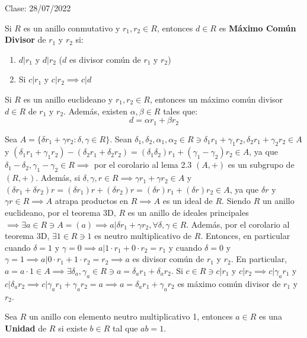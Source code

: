 Clase: 28/07/2022

\begin{definicion}
    Si $R$ es un anillo conmutativo y $r_1,r_2\in R$, entonces $d\in R$ es \textbf{Máximo Común Divisor} de $r_1$ y $r_2$ si: 
    \begin{enumerate}
        \item $d|r_1$ y $d|r_2$ ($d$ es divisor común de $r_1$ y $r_2$)
        \item Si $c|r_1$ y $c|r_2\implies c|d$
    \end{enumerate}
\end{definicion}

\begin{lema}[3.8]
    Si $R$ es un anillo euclideano y $r_1,r_2\in R$, entonces un máximo común divisor $d\in R$ de $r_1$ y $r_2$. Además, existen $\alpha,\beta \in R$ tales que: 
    $$d=\alpha r_1+\beta r_2$$
    \begin{dem}
        Sea $A=\{\delta r_1+ \gamma r_2:\delta, \gamma\in R \}$. Sean $\delta_1,\delta_2,\alpha_1,\alpha_2\in R\ni \delta_1r_1+\gamma_1r_2, \delta_2 r_1+\gamma_2r_2\in A$ y $(\delta_1r_1+\gamma_1r_2)-(\delta_2r_1+\delta_2r_2)=(\delta_1\delta_2)r_1 + (\gamma_1-\gamma_2)r_2\in A$, ya que $\delta_1-\delta_2,\gamma_1-\gamma_2\in R\implies$ por el corolario al lema 2.3 $(A,+)$ es un subgrupo de $(R,+)$. Además, si $\delta, \gamma,r\in R\implies \gamma r_1+\gamma r_2\in A$ y $(\delta r_1+\delta r_2)r=(\delta r_1)r+(\delta r_2)r=(\delta r)r_1+(\delta r)r_2\in A$, ya que $\delta r$ y $\gamma r\in R\implies A$ atrapa productos en $R\implies A$ es un ideal de $R$. Siendo $R$ un anillo euclideano, por el teorema 3D, $R$ es un anillo de ideales principales $\implies \exists a\in R\ni A=(a)\implies a|\delta r_1+\gamma r_2,\forall \delta, \gamma \in R$. Además, por el corolario al teorema 3D, $\exists 1\in R\ni 1$ es neutro multiplicativo de $R$. Entonces, en particular cuando $\delta=1$ y $\gamma=0\implies a|1\cdot r_1+0\cdot r_2=r_1$ y cuando $\delta =0$ y $\gamma =1\implies a|0\cdot r_1+1\cdot r_2=r_2\implies a$ es divisor común de $r_1$ y $r_2$. En particular, $a=a\cdot 1\in A\implies \exists \delta_a,\gamma_a\in R\ni a=\delta_ar_1+\delta_ar_2$. Si $c\in R\ni c|r_1$ y $c|r_2\implies c|\gamma_ar_1$ y $c|\delta_ar_2\implies c|\gamma_ar_1+\gamma_ar_2=a\implies a=\delta_ar_1+\gamma_ar_2$ es máximo común divisor de $r_1$ y $r_2$.  
    \end{dem}
\end{lema}

\begin{definicion}
    Sea $R$ un anillo con elemento neutro multiplicativo 1, entonces $a\in R$ es una \textbf{Unidad} de $R$ si existe $b\in R$ tal que $ab=1$. 
\end{definicion}

